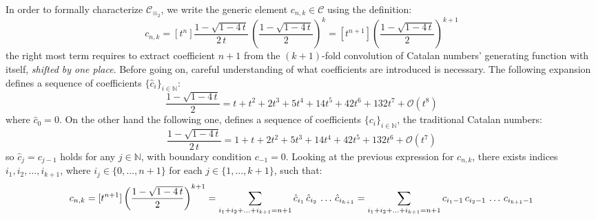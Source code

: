 In order to formally characterize $\mathcal{C}_{\equiv_{2}}$, 
we write the generic element $c_{n,k}\in\mathcal{C}$ using the definition:
\begin{displaymath}
    c_{n,k} = [t^n] \frac{1-\sqrt{1-4\,t}}{2\,t}\,
        \left(\frac{1-\sqrt{1-4\,t}}{2}\right)^{k}
           = [t^{n+1}] \left(\frac{1-\sqrt{1-4\,t}}{2}\right)^{k+1} 
\end{displaymath}
the right most term requires to extract coefficient $n+1$ from the $(k+1)$-fold
convolution of Catalan numbers' generating function with itself, \emph{shifted
by one place}. Before going on, careful
understanding of what coefficients are introduced is necessary. 
The following expansion defines a sequence of coefficients 
$\lbrace \hat{c}_{i}\rbrace_{i\in\mathbb{N}}$:
\begin{displaymath}
    \frac{1-\sqrt{1-4\,t}}{2} = t + t^{2} + 2 t^{3} + 5 t^{4} 
        + 14 t^{5} + 42 t^{6} + 132 t^{7} %
        + \mathcal{O}\left(t^{8}\right)
\end{displaymath}
where $\hat{c}_{0}=0$. On the other hand the following one, defines a sequence 
of coefficients $\lbrace c_{i}\rbrace_{i\in\mathbb{N}}$, 
the traditional Catalan numbers:
\begin{displaymath}
    \frac{1-\sqrt{1-4\,t}}{2\,t} = 1 + t + 2 t^{2} + 5 t^{3} + 14 t^{4} 
        + 42 t^{5} + 132 t^{6} %
        + \mathcal{O}\left(t^{7}\right)
\end{displaymath}
so $\hat{c}_{j} = c_{j-1}$ holds for any $j\in\mathbb{N}$, 
with boundary condition $c_{-1}=0$.  Looking at the previous expression for $c_{n,k}$,
there exists indices $i_{1}, i_{2}, \ldots, i_{k+1}$,
where $i_{j}\in\lbrace0,\ldots,n+1\rbrace$ for each $j\in\lbrace1,\ldots,k+1\rbrace$, 
such that:
\begin{equation}
    \footnotesize
    c_{n,k} = [t^{n+1}] \left(\frac{1-\sqrt{1-4\,t}}{2}\right)^{k+1} 
            = \sum_{i_{1}+ i_{2}+ \ldots+ i_{k+1}=n+1}{
                \hat{c}_{i_{1}}\,\hat{c}_{i_{2}}\,\ldots\,\hat{c}_{i_{k+1}} }
            = \sum_{i_{1}+ i_{2}+ \ldots+ i_{k+1}=n+1}{
                c_{i_{1}-1}\,c_{i_{2}-1}\,\ldots\,c_{i_{k+1}-1} }
    \label{eq:convolution:expansion:for:generic:element:in:catalan:array}
\end{equation}
